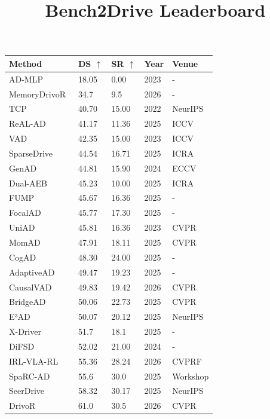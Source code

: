 \documentclass[10pt,twocolumn,letterpaper]{article}
\title{Bench2Drive Leaderboard}
\begin{document}
\begin{table}[t]
\setlength{\tabcolsep}{4pt}
\small
\centering
\begin{tabular}{l|ll|ll}
\toprule
\textbf{Method} & \textbf{DS} $\uparrow$ & \textbf{SR} $\uparrow$ & \textbf{Year} & \textbf{Venue} \\
\midrule
AD-MLP~\cite{Zhai2023ARXIV} & 18.05 & 0.00 & 2023 & - \\
MemoryDrivoR~\cite{Löwens2026ARXIV} & 34.7 & 9.5 & 2026 & - \\
TCP~\cite{Wu2022NeurIPS} & 40.70 & 15.00 & 2022 & NeurIPS \\
ReAL-AD~\cite{Lu2025ICCV} & 41.17 & 11.36 & 2025 & ICCV \\
VAD~\cite{Jiang2023ICCV} & 42.35 & 15.00 & 2023 & ICCV \\
SparseDrive~\cite{Sun2025ICRA} & 44.54 & 16.71 & 2025 & ICRA \\
GenAD~\cite{Zheng2024ECCV} & 44.81 & 15.90 & 2024 & ECCV \\
Dual-AEB~\cite{Zhang2025ICRA} & 45.23 & 10.00 & 2025 & ICRA \\
FUMP~\cite{Liu2025ARXIVc} & 45.67 & 16.36 & 2025 & - \\
FocalAD~\cite{Sun2025ARXIV} & 45.77 & 17.30 & 2025 & - \\
UniAD~\cite{Hu2023CVPR} & 45.81 & 16.36 & 2023 & CVPR \\
MomAD~\cite{Song2025CVPR} & 47.91 & 18.11 & 2025 & CVPR \\
CogAD~\cite{Wang2025ARXIV} & 48.30 & 24.00 & 2025 & - \\
AdaptiveAD~\cite{Tang2025ARXIV} & 49.47 & 19.23 & 2025 & - \\
CausalVAD~\cite{Tang2026CVPR} & 49.83 & 19.42 & 2026 & CVPR \\
BridgeAD~\cite{Zhang2025CVPR} & 50.06 & 22.73 & 2025 & CVPR \\
E³AD~\cite{Niu2025NEURIPS} & 50.07 & 20.12 & 2025 & NeurIPS \\
X-Driver~\cite{Liu2025ARXIVb} & 51.7 & 18.1 & 2025 & - \\
DiFSD~\cite{Su2024ARXIV} & 52.02 & 21.00 & 2024 & - \\
IRL-VLA-RL~\cite{Anqing2026CVPRWORK} & 55.36 & 28.24 & 2026 & CVPRF \\
SpaRC-AD~\cite{Wolters2025ICCVWORK} & 55.6 & 30.0 & 2025 & Workshop \\
SeerDrive~\cite{Zhang2025NEURIPS} & 58.32 & 30.17 & 2025 & NeurIPS \\
DrivoR~\cite{Kirby2026CVPR} & 61.0 & 30.5 & 2026 & CVPR \\

\end{tabular}
\end{table}
\end{document}
